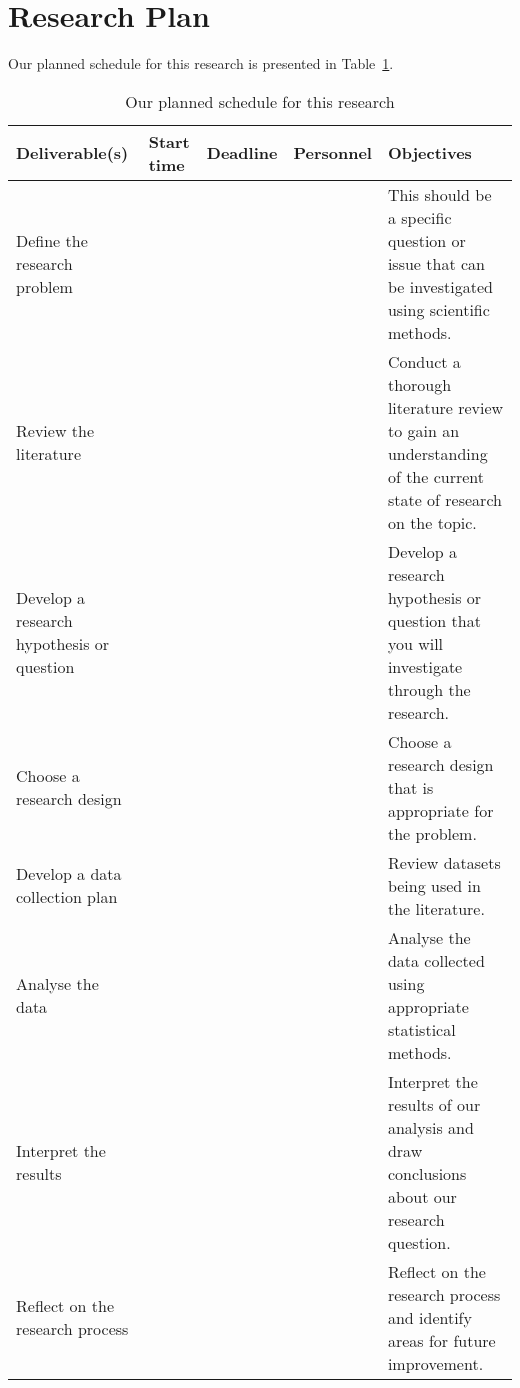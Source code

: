 \section{Research Plan}
Our planned schedule for this research is presented in Table~\ref{tab:research_plan}.

\begin{table}[htp]
\begin{tabular}{|p{100pt}|l|l|l|p{100pt}|}
\hline
\textbf{Deliverable(s)}                   & \textbf{Start time} & \textbf{Deadline} & \textbf{Personnel} & \textbf{Objectives}                                                                                          \\ \hline
Define the research problem               &                     &                   &                    & This should be a specific question or issue that can be investigated using scientific methods.               \\ \hline
Review the literature                     &                     &                   &                    & Conduct a thorough literature review to gain an understanding of the current state of research on the topic. \\ \hline
Develop a research hypothesis or question &                     &                   &                    & Develop a research hypothesis or question that you will investigate through the research.                    \\ \hline
Choose a research design                  &                     &                   &                    & Choose a research design that is appropriate for the problem.                                                \\ \hline
Develop a data collection plan            &                     &                   &                    & Review datasets being used in the literature.                                                                \\ \hline
Analyse the data                          &                     &                   &                    & Analyse the data collected using appropriate statistical methods.                                            \\ \hline
Interpret the results                     &                     &                   &                    & Interpret the results of our analysis and draw conclusions about our research question.                      \\ \hline
Reflect on the research process           &                     &                   &                    & Reflect on the research process and identify areas for future improvement.                                   \\ \hline
\end{tabular}
\caption{Our planned schedule for this research}\label{tab:research_plan}
\end{table}